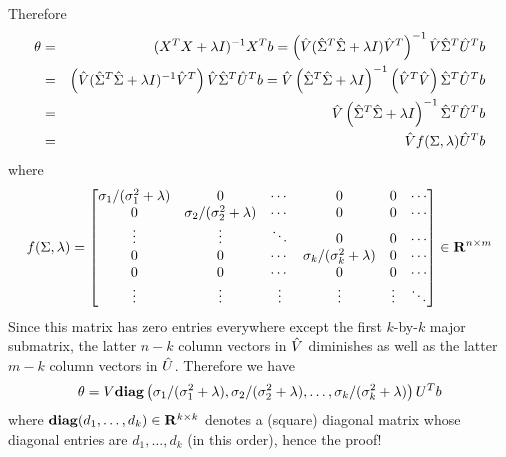 \begin{enumerate}
\begin{solution}
Therefore
\begin{eqnarray}
\theta
&=& (X^TX + \lambda I)^{-1} X^T b
= \left(\hat{V}(\hat{\Sigma}^T\hat{\Sigma} + \lambda I)\hat{V}^T \right)^{-1} \hat{V} \hat{\Sigma}^T \hat{U}^T b
\\
&=&
\left( \hat{V}(\hat{\Sigma}^T\hat{\Sigma} + \lambda I)^{-1} \hat{V}^T \right) \hat{V} \hat{\Sigma}^T \hat{U}^T b
= \hat{V} \left(\hat{\Sigma}^T\hat{\Sigma} + \lambda I \right)^{-1} \left(\hat{V}^T \hat{V} \right) \hat{\Sigma}^T \hat{U}^T b
\\
&=&
\hat{V} \left(\hat{\Sigma}^T\hat{\Sigma} + \lambda I \right)^{-1} \hat{\Sigma}^T \hat{U}^T b
\\
&=&
\hat{V}
f(\Sigma, \lambda)
\hat{U}^T b
\end{eqnarray}
where
\begin{equation}
f(\Sigma, \lambda) =
\begin{bmatrix}
\sigma_1/(\sigma_1^2+\lambda) & 0                             & \cdots & 0                             & 0          & \cdots
\\
0                             & \sigma_2/(\sigma_2^2+\lambda) & \cdots & 0                             & 0          & \cdots
\\
\vdots                        & \vdots                        & \ddots & 0                             & 0          & \cdots
\\
0                             & 0                             & \cdots & \sigma_k/(\sigma_k^2+\lambda) & 0          & \cdots
\\
0                             & 0                             & \cdots & 0                             & 0          & \cdots
\\
\vdots                        & \vdots                        & \vdots & \vdots                        & \vdots     & \ddots
\end{bmatrix}
\in\mathbf{R}^{n\times m}
\end{equation}
Since this matrix has zero entries everywhere except the first $k$-by-$k$ major submatrix,
the latter $n-k$ column vectors in $\hat{V}$ diminishes as well as the latter $m-k$ column vectors in $\hat{U}$.
Therefore we have
\begin{equation}
\theta = V \mathbf{diag} \left(\sigma_1/(\sigma_1^2+\lambda), \sigma_2/(\sigma_2^2+\lambda), \ldots, \sigma_k/(\sigma_k^2+\lambda) \right) U^T b
\end{equation}
where $\mathbf{diag}(d_1,\ldots,d_k)\in\mathbf{R}^{k\times k}$ denotes a (square) diagonal matrix whose diagonal entries are $d_1, \ldots, d_k$ (in this order),
hence the proof!

\end{solution}





\end{enumerate}
